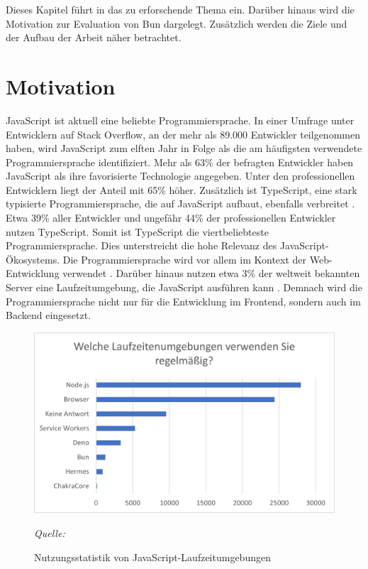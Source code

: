 \pagestyle{fancy-style}
 \label{ch:introduction}
Dieses Kapitel führt in das zu erforschende Thema ein. Darüber hinaus wird die Motivation zur Evaluation von Bun dargelegt. Zusätzlich werden die Ziele und der Aufbau der Arbeit näher betrachtet.

\section{Motivation} \label{sec:introduction-motivation}
JavaScript ist aktuell eine beliebte Programmiersprache. In einer Umfrage unter Entwicklern auf Stack Overflow, an der mehr als 89.000 Entwickler teilgenommen haben, wird JavaScript zum elften Jahr in Folge als die am häufigsten verwendete Programmiersprache identifiziert. Mehr als 63\% der befragten Entwickler haben JavaScript als ihre favorisierte Technologie angegeben. Unter den professionellen Entwicklern liegt der Anteil mit 65\% höher. Zusätzlich ist TypeScript, eine stark typisierte Programmiersprache, die auf JavaScript aufbaut, ebenfalls verbreitet \cite{Microsoft.o.J.}. Etwa 39\% aller Entwickler und ungefähr 44\% der professionellen Entwickler nutzen TypeScript. Somit ist TypeScript die viertbeliebteste Programmiersprache. Dies unterstreicht die hohe Relevanz des JavaScript-Ökosystems.\cite{StackOverflow.2023}\newline
Die Programmiersprache wird vor allem im Kontext der Web-Entwicklung verwendet \cite{Brown.November2019}. Darüber hinaus nutzen etwa 3\% der weltweit bekannten Server eine Laufzeitumgebung, die JavaScript ausführen kann \cite{QSuccess.2023}. Demnach wird die Programmiersprache nicht nur für die Entwicklung im Frontend, sondern auch im Backend eingesetzt.\\

\begin{figure}[h]
	\centering
	\includegraphics[width=\linewidth]{./images/WhichRuntimesDoYouUseRegularly}
	\caption{Nutzungsstatistik von JavaScript-Laufzeitumgebungen}
	\label{fig:runtime-share}
	\textit{Quelle: \cite{Greif.2022}}
\end{figure}

